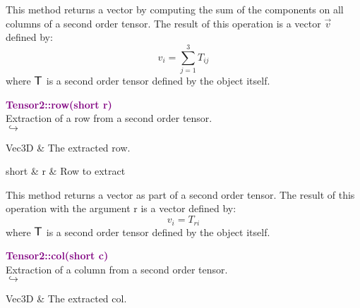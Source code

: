 This method returns a vector by computing the sum of the components on all columns of a second order tensor.
The result of this operation is a vector $\overrightarrow{v}$ defined by:
\begin{equation*}
v_{i}=\sum_{j=1}^{3}T_{ij}
\end{equation*}
where $\mbox{\large\ensuremath{\mathsf{T}}}$ is a second order tensor defined by the object itself.

\textcolor{purple}{\textbf{Tensor2::row(short r)}}\label{Tensor2::row(short r)}\\
Extraction of a row from a second order tensor.\\ \hspace*{5mm}$\hookrightarrow$
\vspace*{-2em}\begin{tcolorbox}[grow to left by=-1cm, width=\textwidth-1cm,myArgs,tabularx={l|R}]
Vec3D & The extracted row.
\end{tcolorbox}

\begin{tcolorbox}[width=\textwidth,myArgs,tabularx={ll|R}]
short & r & Row to extract
\end{tcolorbox}

This method returns a vector as part of a second order tensor.
The result of this operation with the argument r is a vector defined by:
\begin{equation*}
v_{i} = T_{ri}
\end{equation*}
where $\mbox{\large\ensuremath{\mathsf{T}}}$ is a second order tensor defined by the object itself.

\textcolor{purple}{\textbf{Tensor2::col(short c)}}\label{Tensor2::col(short c)}\\
Extraction of a column from a second order tensor.\\ \hspace*{5mm}$\hookrightarrow$
\vspace*{-2em}\begin{tcolorbox}[grow to left by=-1cm, width=\textwidth-1cm,myArgs,tabularx={l|R}]
Vec3D & The extracted col.
\end{tcolorbox}

